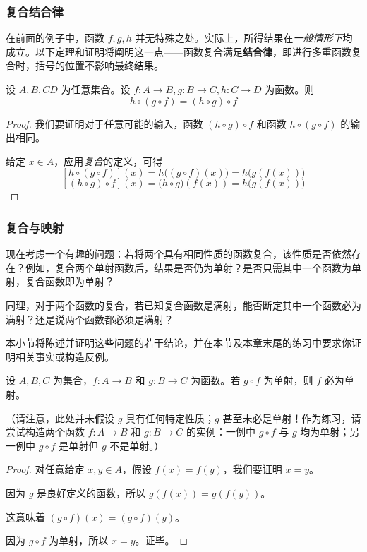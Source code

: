 \subsubsection*{复合结合律}

在前面的例子中，函数 $f, g, h$ 并无特殊之处。实际上，所得结果在\emph{一般情形下}均成立。以下定理和证明将阐明这一点——函数复合满足\textbf{结合律}，即进行多重函数复合时，括号的位置不影响最终结果。

\begin{theorem}
    设 $A,B,C D$ 为任意集合。设 $f : A \to B, g : B \to C, h : C \to D$ 为函数。则
    \[h \circ (g \circ f) = (h \circ g) \circ f\]
\end{theorem}

\begin{proof}
    我们要证明对于任意可能的输入，函数 $(h \circ g) \circ f$ 和函数 $h \circ (g \circ f)$ 的输出相同。

    给定 $x \in A$，应用\emph{复合}的定义，可得
    \[[h \circ (g \circ f)](x) = h\big((g \circ f)(x)\big) = h\big(g(f(x))\big)\]
    \[[(h \circ g) \circ f](x) = \big(h \circ g\big)(f(x)) = h\big(g(f(x))\big)\]
\end{proof}

\subsubsection*{复合与映射}

现在考虑一个有趣的问题：若将两个具有相同性质的函数复合，该性质是否依然存在？例如，复合两个单射函数后，结果是否仍为单射？是否只需其中一个函数为单射，复合函数即为单射？

同理，对于两个函数的复合，若已知复合函数是满射，能否断定其中一个函数必为满射？还是说两个函数都必须是满射？

本小节将陈述并证明这些问题的若干结论，并在本节及本章末尾的练习中要求你证明相关事实或构造反例。

\begin{proposition}
    设 $A, B, C$ 为集合，$f : A \to B$ 和 $g : B \to C$ 为函数。若 $g \circ f$ 为单射，则 $f$ 必为单射。
\end{proposition}

（请注意，此处并未假设 $g$ 具有任何特定性质；$g$ 甚至未必是单射！作为练习，请尝试构造两个函数 $f: A \to B$ 和 $g: B \to C$ 的实例：一例中 $g \circ f$ 与 $g$ 均为单射；另一例中 $g \circ f$ 是单射但 $g$ 不是单射。）

\begin{proof}
    对任意给定 $x,y \in A$，假设 $f(x)=f(y)$，我们要证明 $x=y$。

    因为 $g$ 是良好定义的函数，所以 $g(f(x)) = g(f(y))$。

    这意味着 $(g \circ f)(x) = (g \circ f)(y)$。

    因为 $g \circ f$ 为单射，所以 $x=y$。证毕。
\end{proof}

